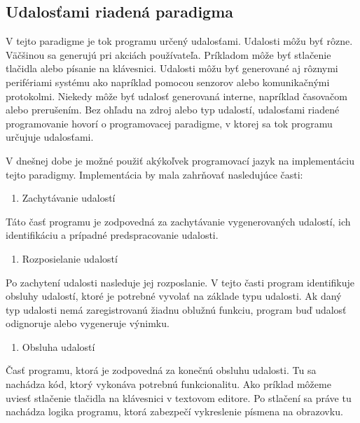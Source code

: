 \subsection{Udalosťami riadená paradigma}
\noindent \par V tejto paradigme je tok programu určený udalosťami. Udalosti môžu byť
rôzne. Väčšinou sa generujú pri akciách používateľa. Príkladom môže byť stlačenie tlačidla
alebo písanie na klávesnici. Udalosti môžu byť generované aj rôznymi perifériami systému ako napríklad pomocou senzorov alebo komunikačnými protokolmi. Niekedy môže byť udalosť generovaná interne, napríklad časovačom alebo prerušením. Bez ohľadu na
zdroj alebo typ udalostí, udalosťami riadené programovanie 
hovorí o programovacej paradigme, v ktorej sa tok
programu určujuje udalosťami.
\par V dnešnej dobe je možné použiť akýkoľvek programovací jazyk na implementáciu tejto paradigmy. Implementácia by mala zahrňovať nasledujúce časti:
\begin{enumerate}
  \item Zachytávanie udalostí
\end{enumerate}

\noindent \par 
Táto časť programu je zodpovedná za zachytávanie vygenerovaných udalostí, ich identifikáciu a prípadné predspracovanie udalosti.

\begin{enumerate}[resume]
  \item Rozposielanie udalostí
\end{enumerate}

\noindent \par
Po zachytení udalosti nasleduje jej rozposlanie. V tejto časti program identifikuje obsluhy udalostí, ktoré je potrebné vyvolať na základe typu udalosti. Ak daný typ udalosti nemá zaregistrovanú žiadnu oblužnú funkciu, program buď udalosť odignoruje alebo vygeneruje výnimku.

\begin{enumerate}[resume]
  \item Obsluha udalostí
\end{enumerate}
 
\noindent \par
Časť programu, ktorá je zodpovedná za konečnú obsluhu udalosti. Tu sa nachádza kód, ktorý vykonáva potrebnú funkcionalitu. Ako príklad môžeme uviesť stlačenie tlačidla na klávesnici v textovom editore. Po stlačení sa práve tu nachádza logika programu, ktorá zabezpečí vykreslenie písmena na obrazovku.

